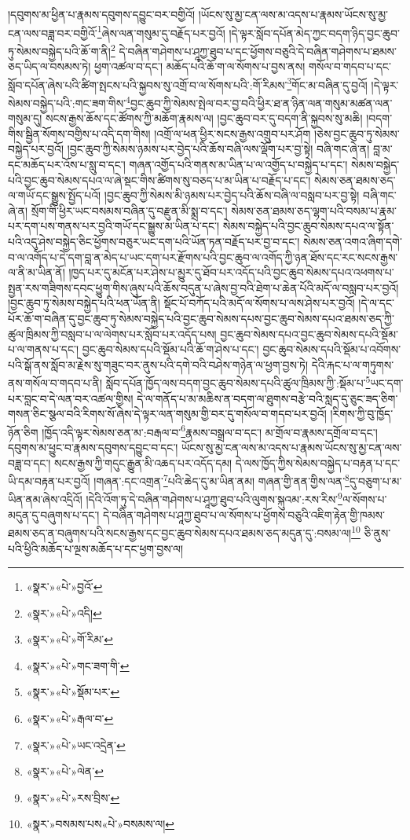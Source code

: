 །དབུགས་མ་ཕྱིན་པ་རྣམས་དབུགས་དབྱུང་བར་བགྱིའོ། །ཡོངས་སུ་མྱ་ངན་ལས་མ་འདས་པ་རྣམས་ཡོངས་སུ་མྱ་ངན་ལས་བཟླ་བར་བགྱིའོ་\footnote{«སྣར་»«པེ་»བྱའོ་}ཞེས་ལན་གསུམ་དུ་བརྗོད་པར་བྱའོ། །དེ་ལྟར་སློབ་དཔོན་མེད་ཀྱང་བདག་ཉིད་བྱང་ཆུབ་ཏུ་སེམས་བསྐྱེད་པའི་ཆོ་ག་ནི།\footnote{«སྣར་»«པེ་»འདི།} དེ་བཞིན་གཤེགས་པ་ཤཱཀྱ་ཐུབ་པ་དང་ཕྱོགས་བཅུའི་དེ་བཞིན་གཤེགས་པ་ཐམས་ཅད་ཡིད་ལ་བསམས་ཏེ། ཕྱག་འཚལ་བ་དང་། མཆོད་པའི་ཆོ་ག་ལ་སོགས་པ་བྱས་ནས། གསོལ་བ་གདབ་པ་དང་སློབ་དཔོན་ཞེས་པའི་ཚིག་སྤངས་པའི་སྐྱབས་སུ་འགྲོ་བ་ལ་སོགས་པའི་:གོ་རིམས་\footnote{«སྣར་»«པེ་»གོ་རིམ་}གོང་མ་བཞིན་དུ་བྱའོ། །དེ་ལྟར་སེམས་བསྐྱེད་པའི་:གང་ཟག་གིས་\footnote{«སྣར་»«པེ་»གང་ཟག་གི་}བྱང་ཆུབ་ཀྱི་སེམས་སྤེལ་བར་བྱ་བའི་ཕྱིར་ཐ་ན་ཉིན་ལན་གསུམ་མཚན་ལན་གསུམ་དུ། སངས་རྒྱས་ཆོས་དང་ཚོགས་ཀྱི་མཆོག་རྣམས་ལ། །བྱང་ཆུབ་བར་དུ་བདག་ནི་སྐྱབས་སུ་མཆི། །བདག་གིས་སྦྱིན་སོགས་བགྱིས་པ་འདི་དག་གིས། །འགྲོ་ལ་ཕན་ཕྱིར་སངས་རྒྱས་འགྲུབ་པར་ཤོག །ཅེས་བྱང་ཆུབ་ཏུ་སེམས་བསྐྱེད་པར་བྱའོ། །བྱང་ཆུབ་ཀྱི་སེམས་ཉམས་པར་བྱེད་པའི་ཆོས་བཞི་ལས་ལྡོག་པར་བྱ་སྟེ། བཞི་གང་ཞེ་ན། བླ་མ་དང་མཆོད་པར་འོས་པ་སླུ་བ་དང་། གཞན་འགྱོད་པའི་གནས་མ་ཡིན་པ་ལ་འགྱོད་པ་བསྐྱེད་པ་དང་། སེམས་བསྐྱེད་པའི་བྱང་ཆུབ་སེམས་དཔའ་ལ་ཞེ་སྡང་གིས་ཚིགས་སུ་བཅད་པ་མ་ཡིན་པ་བརྗོད་པ་དང་། སེམས་ཅན་ཐམས་ཅད་ལ་གཡོ་དང་སྒྱུས་སྤྱོད་པའོ། །བྱང་ཆུབ་ཀྱི་སེམས་མི་ཉམས་པར་བྱེད་པའི་ཆོས་བཞི་ལ་བསླབ་པར་བྱ་སྟེ། བཞི་གང་ཞེ་ན། སྲོག་གི་ཕྱིར་ཡང་བསམས་བཞིན་དུ་བརྫུན་མི་སྨྲ་བ་དང་། སེམས་ཅན་ཐམས་ཅད་ལྷག་པའི་བསམ་པ་རྣམ་པར་དག་པས་གནས་པར་བྱའི་གཡོ་དང་སྒྱུས་མ་ཡིན་པ་དང་། སེམས་བསྐྱེད་པའི་བྱང་ཆུབ་སེམས་དཔའ་ལ་སྟོན་པའི་འདུ་ཤེས་བསྐྱེད་ཅིང་ཕྱོགས་བཅུར་ཡང་དག་པའི་ཡོན་ཏན་བརྗོད་པར་བྱ་བ་དང་། སེམས་ཅན་འགའ་ཞིག་དགེ་བ་ལ་འགོད་པ་དེ་དག་བླ་ན་མེད་པ་ཡང་དག་པར་རྫོགས་པའི་བྱང་ཆུབ་ལ་འགོད་ཀྱི་ཉན་ཐོས་དང་རང་སངས་རྒྱས་ལ་ནི་མ་ཡིན་ནོ། །ཁྱད་པར་དུ་མངོན་པར་ཤེས་པ་མྱུར་དུ་ཐོབ་པར་འདོད་པའི་བྱང་ཆུབ་སེམས་དཔའ་འཕགས་པ་སྤྱན་རས་གཟིགས་དབང་ཕྱུག་གིས་ཞུས་པའི་ཆོས་བདུན་པ་ཞེས་བྱ་བའི་ཐེག་པ་ཆེན་པོའི་མདོ་ལ་བསླབ་པར་བྱའོ། །བྱང་ཆུབ་ཏུ་སེམས་བསྐྱེད་པའི་ཕན་ཡོན་ནི། སྡོང་པོ་བཀོད་པའི་མདོ་ལ་སོགས་པ་ལས་ཤེས་པར་བྱའོ། །དེ་ལ་དང་པོར་ཆོ་ག་བཞིན་དུ་བྱང་ཆུབ་ཏུ་སེམས་བསྐྱེད་པའི་བྱང་ཆུབ་སེམས་དཔས་བྱང་ཆུབ་སེམས་དཔའ་ཐམས་ཅད་ཀྱི་ཚུལ་ཁྲིམས་ཀྱི་བསླབ་པ་ལ་ལེགས་པར་སློབ་པར་འདོད་པས། བྱང་ཆུབ་སེམས་དཔའ་བྱང་ཆུབ་སེམས་དཔའི་སྡོམ་པ་ལ་གནས་པ་དང་། བྱང་ཆུབ་སེམས་དཔའི་སྡོམ་པའི་ཆོ་ག་ཤེས་པ་དང་། བྱང་ཆུབ་སེམས་དཔའི་སྡོམ་པ་འབོགས་པའི་སྒོ་ནས་སློབ་མ་རྗེས་སུ་གཟུང་བར་ནུས་པའི་དགེ་བའི་བཤེས་གཉེན་ལ་ཕྱག་བྱས་ཏེ། དེའི་རྐང་པ་ལ་གཏུགས་ནས་གསོལ་བ་གདབ་པ་ནི། སློབ་དཔོན་ཁྱོད་ལས་བདག་བྱང་ཆུབ་སེམས་དཔའི་ཚུལ་ཁྲིམས་ཀྱི་:སྡོམ་པ་\footnote{«སྣར་»«པེ་»སྡོམ་པར་}ཡང་དག་པར་བླང་བ་དེ་ལན་བར་འཚལ་གྱིས། དེ་ལ་གནོད་པ་མ་མཆིས་ན་བདག་ལ་ཐུགས་བརྩེ་བའི་སླད་དུ་ཅུང་ཟད་ཅིག་གསན་ཅིང་སྩལ་བའི་རིགས་སོ་ཞེས་དེ་ལྟར་ལན་གསུམ་གྱི་བར་དུ་གསོལ་བ་གདབ་པར་བྱའོ། །རིགས་ཀྱི་བུ་ཁྱོད་ཉོན་ཅིག །ཁྱོད་འདི་ལྟར་སེམས་ཅན་མ་:བརྒལ་བ་\footnote{«སྣར་»«པེ་»རྒལ་བ་}རྣམས་བསྒྲལ་བ་དང་། མ་གྲོལ་བ་རྣམས་དགྲོལ་བ་དང་། དབུགས་མ་ཕྱུང་བ་རྣམས་དབུགས་དབྱུང་བ་དང་། ཡོངས་སུ་མྱ་ངན་ལས་མ་འདས་པ་རྣམས་ཡོངས་སུ་མྱ་ངན་ལས་བཟླ་བ་དང་། སངས་རྒྱས་ཀྱི་གདུང་རྒྱུན་མི་འཆད་པར་འདོད་དམ། དེ་ལས་ཁྱོད་ཀྱིས་སེམས་བསྐྱེད་པ་བརྟན་པ་དང་ཡི་དམ་བརྟན་པར་བྱའོ། །གཞན་:དང་འགྲན་\footnote{«སྣར་»«པེ་»ཡང་འདྲེན་}པའི་ཆེད་དུ་མ་ཡིན་ནམ། གཞན་གྱི་ནན་གྱིས་ལན་\footnote{«སྣར་»«པེ་»ལེན་}དུ་བཅུག་པ་མ་ཡིན་ནམ་ཞེས་འདྲིའོ། །དེའི་འོག་ཏུ་དེ་བཞིན་གཤེགས་པ་ཤཱཀྱ་ཐུབ་པའི་ལུགས་སྐུའམ་:རས་རིས་\footnote{«སྣར་»«པེ་»རས་བྲིས་}ལ་སོགས་པ་མདུན་དུ་བཞུགས་པ་དང་། དེ་བཞིན་གཤེགས་པ་ཤཱཀྱ་ཐུབ་པ་ལ་སོགས་པ་ཕྱོགས་བཅུའི་འཇིག་རྟེན་གྱི་ཁམས་ཐམས་ཅད་ན་བཞུགས་པའི་སངས་རྒྱས་དང་བྱང་ཆུབ་སེམས་དཔའ་ཐམས་ཅད་མདུན་དུ་:བསམ་ལ།\footnote{«སྣར་»བསམས་པས«པེ་»བསམས་ལ།} ཅི་ནུས་པའི་ཕྱིའི་མཆོད་པ་ལྔས་མཆོད་པ་དང་ཕྱག་བྱས་ལ། 
